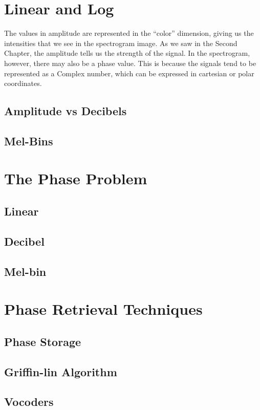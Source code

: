 \documentclass{book}
\begin{document}
\begin{appendices}
\section{Linear and Log}
\qquad The values in amplitude are represented in the “color” dimension, giving us the intensities that we see in the spectrogram image.
As we saw in the Second Chapter, the amplitude tells us the strength of the signal.
In the spectrogram, however, there may also be a phase value.
This is because the signals tend to be represented as a Complex number, which can be expressed in cartesian or polar coordinates.
\par
\subsection{Amplitude vs Decibels}
\subsection{Mel-Bins}
\section{The Phase Problem}
\subsection{Linear}
\subsection{Decibel}
\subsection{Mel-bin}
\section{Phase Retrieval Techniques}
\subsection{Phase Storage}
\subsection{Griffin-lin Algorithm}
\subsection{Vocoders}


\end{appendices}
\end{document}
